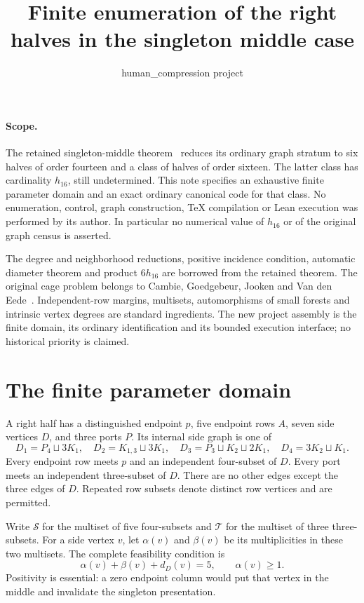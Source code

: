 \documentclass[11pt]{article}
\title{Finite enumeration of the right halves in the singleton middle case}
\author{human\_compression project}
\date{}
\begin{document}
\maketitle

\paragraph{Scope.}
The retained singleton-middle theorem~\cite{middle} reduces its ordinary
graph stratum to six halves of order fourteen and a class of halves of
order sixteen. The latter class has cardinality $h_{16}$, still
undetermined. This note specifies an exhaustive finite parameter domain
and an exact ordinary canonical code for that class. No enumeration,
control, graph construction, TeX compilation or Lean execution was
performed by its author. In particular no numerical value of $h_{16}$
or of the original graph census is asserted.

The degree and neighborhood reductions, positive incidence condition,
automatic diameter theorem and product $6h_{16}$ are borrowed from the
retained theorem. The original cage problem belongs to Cambie,
Goedgebeur, Jooken and Van den Eede~\cite{cages}. Independent-row margins,
multisets, automorphisms of small forests and intrinsic vertex degrees
are standard ingredients. The new project assembly is the finite domain,
its ordinary identification and its bounded execution interface; no
historical priority is claimed.

\section*{The finite parameter domain}

A right half has a distinguished endpoint $p$, five endpoint rows $A$,
seven side vertices $D$, and three ports $P$. Its internal side graph is
one of
\[
 D_1=P_4\sqcup3K_1,\quad D_2=K_{1,3}\sqcup3K_1,\quad
 D_3=P_3\sqcup K_2\sqcup2K_1,\quad D_4=3K_2\sqcup K_1.
\]
Every endpoint row meets $p$ and an independent four-subset of $D$.
Every port meets an independent three-subset of $D$. There are no other
edges except the three edges of $D$. Repeated row subsets denote
distinct row vertices and are permitted.

Write $\mathcal S$ for the multiset of five four-subsets and
$\mathcal T$ for the multiset of three three-subsets. For a side vertex
$v$, let $\alpha(v)$ and $\beta(v)$ be its multiplicities in these two
multisets. The complete feasibility condition is
\begin{equation}\label{margins}
 \alpha(v)+\beta(v)+d_D(v)=5,\qquad \alpha(v)\geq1.
\end{equation}
Positivity is essential: a zero endpoint column would put that vertex
in the middle and invalidate the singleton presentation.
\end{document}
